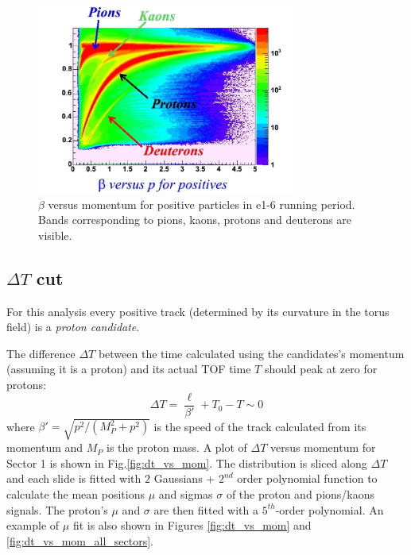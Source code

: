 \begin{figure}[h]
  \centering
		\includegraphics[width=0.75\textwidth ]{img/beta_vs_mom.jpg}
		\caption{ $\beta$ versus momentum for positive particles in e1-6 running period. Bands
                    corresponding to pions, kaons, protons and deuterons are visible.}
 		\label{fig:beta_vs_mom}
\end{figure}



\subsection{$\Delta T$ cut}
\label{sec:clas_timing}

For this analysis every positive track (determined by its curvature in the torus field) 
is a {\it proton candidate}.

The difference $\Delta T$ between the time calculated using
the candidates's momentum (assuming it is a proton) and its actual TOF time $T$ 
should peak at zero for protons:
\begin{equation}
 \label{eq:protondt}
  \Delta T = \frac{\ell}{\beta'} + T_{0} - T\sim0
\end{equation}
where $\beta' = \sqrt{ p^2 /( M_P^2 + p^2 ) }$ is the speed of the track calculated from its
momentum and $M_P$ is the proton mass. 
A plot of $\Delta T$ versus momentum for Sector 1 is shown in 
Fig.\ref{fig:dt_vs_mom}. The distribution is sliced along $\Delta T$ and each slide is fitted
with $2$ Gaussians + $2^{nd}$ order polynomial function to calculate the mean 
positions $\mu$ and sigmas $\sigma$ of the proton and pions/kaons signals. 
The proton's $\mu$ and $\sigma$ are then fitted with a $5^{th}$-order polynomial. 
An example of $\mu$ fit is also shown in 
Figures \ref{fig:dt_vs_mom} and \ref{fig:dt_vs_mom_all_sectors}.

